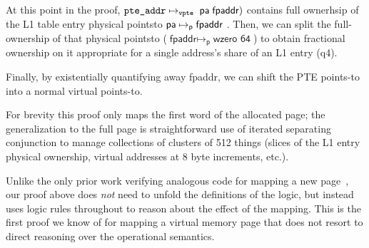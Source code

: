 At this point in the proof,  $\texttt{pte\_addr} \mapsto_{\texttt{vpte}}  \; \textsf{pa}\; \textsf{fpaddr})$ 
contains  full ownerhsip of the L1 table entry physical pointsto $\textsf{pa}
\mapsto_{\mathsf{p}} \textsf{fpaddr}$ . Then, we can split the full-ownership of that
physical pointsto
($\textsf{fpaddr}\mapsto_{\textsf{p}} \;\textsf{wzero 64}$) to obtain
fractional ownership on it appropriate for a single address's share of an L1 entry (q4).
\begin{comment}
Since we know $\texttt{addr\_L1 }(\vaddr,
\entryo) \mapsto_{\mathsf{p}} \{q4\} \;\textsf{fpaddr}$) from
$\mapsto_{\textsf{vpte}}$, after the split of the PTE points-to, and, thanks to the post-condition of the page-table walk (Specification of \textsf{pte\_walkpgdir} in Figure \ref{}), we know the existence of L4-L2 mappings reaching to the L1 exist, so that we can add the last mapping $\texttt{fpaddr} \mapsto_{p} (\texttt{wzero 64})$ to obtain the complete table-walk.
\todo{with the virtual-pte-pointsto assertions (L4\_L1\_PointsTo($\vaddr$ l4e l3e l2e
fpaddr)) in Line 25}

Finally, we can insert $\vaddr$ into the ghost page-table-walk summarization
map ($\theta$) to change its state from unmapped ($\ulcorner \theta
\;!!\;\vaddr = \texttt{None}\urcorner$ (Line 28) and the
precondition) to mapped (Line 29) using Iris' ghost-map update
($\sqsubseteq$), and construct a PTE -points-to $\vaddr
\mapsto_{\textsf{vpte}}\; \qfrac \;\fpaddr\;(\textsf{wzero 64})$ (Line 31) using $\sumwalkabs\vaddr\qfrac\fpaddr$ obtained from ghost
page-table-walk insertions, $\ghostmaptoken{\delta{}s}{\rtv}{\delta}$ from unfolding the
definition of $\mapsto_{\textsf{vpte}}$, and $\fpaddr
\mapsto_{\textsf{p}} \textsf{wzero 64}$.
\end{comment}
Finally, by existentially quantifying away \textsf{fpaddr},
we can shift the PTE points-to into a normal virtual points-to.

For brevity this proof only maps the first word of the allocated page; the generalization to the full page
is straightforward use of iterated separating conjunction to manage collections of clusters of 512 things
(slices of the L1 entry physical ownership, virtual addresses at 8 byte increments, etc.).

Unlike the only prior work verifying analogous code for mapping a new page~\cite{kolanski08vstte,kolanski09tphols}, our proof above
does \emph{not} need to unfold the definitions of the logic,
but instead uses logic rules throughout to reason about the effect of the mapping. 
This is the first proof we know of for mapping a virtual memory page that does not resort to direct reasoning over the operational semantics.

